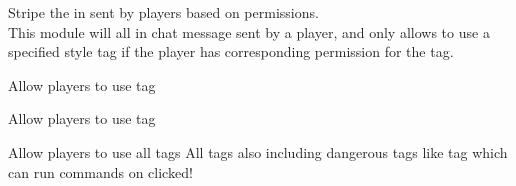 \label{ch:chat_stripe}
Stripe the  in  sent by players based on permissions.\\

This module will  all  in chat message sent by a player, and only allows to use a specified style tag if the player has corresponding permission for the tag.

\begin{example}{Allow players to use  tag}
\end{example}

\begin{example}{Allow players to use  tag}
\end{example}

\begin{example}{Allow players to use all tags}
    All tags also including dangerous tags like  tag which can run commands on clicked!\\
\end{example}
